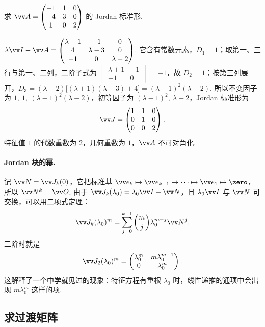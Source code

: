 	\begin{example}\label{eg:jordan3}
		求 $\vv A=\begin{pmatrix}-1&1&0\\-4&3&0\\1&0&2\end{pmatrix}$ 的 Jordan 标准形.
	\end{example}
	\begin{solution}
		$\lambda\vv I-\vv A=\begin{pmatrix}\lambda+1&-1&0\\4&\lambda-3&0\\-1&0&\lambda-2\end{pmatrix}$. 它含有常数元素，$D_1=1$；取第一、三行与第一、二列，二阶子式为 $\begin{vmatrix}\lambda+1&-1\\-1&0\end{vmatrix}=-1$，故 $D_2=1$；按第三列展开，$D_3=(\lambda-2)\big[(\lambda+1)(\lambda-3)+4\big]=(\lambda-1)^2(\lambda-2)$. 所以不变因子为 $1,\ 1,\ (\lambda-1)^2(\lambda-2)$，初等因子为 $(\lambda-1)^2,\ \lambda-2$，Jordan 标准形为
		\[\vv J=\begin{pmatrix}1&1&0\\0&1&0\\0&0&2\end{pmatrix}.\]
		特征值 $1$ 的代数重数为 $2$，几何重数为 $1$，$\vv A$ 不可对角化.
	\end{solution}
	
	\paragraph*{Jordan 块的幂.} 记 $\vv N=\vv J_k(0)$，它把标准基 $\vv e_k\mapsto\vv e_{k-1}\mapsto\cdots\mapsto\vv e_1\mapsto\zero$，所以 $\vv N^k=\vv O$. 由于 $\vv J_k(\lambda_0)=\lambda_0\vv I+\vv N$，且 $\lambda_0\vv I$ 与 $\vv N$ 可交换，可以用二项式定理：
	\[\vv J_k(\lambda_0)^m=\sum_{j=0}^{k-1}\binom mj\lambda_0^{m-j}\vv N^j.\]
	二阶时就是
	\[\vv J_2(\lambda_0)^m=\begin{pmatrix}\lambda_0^m&m\lambda_0^{m-1}\\0&\lambda_0^m\end{pmatrix}.\]
	这解释了一个中学就见过的现象：特征方程有重根 $\lambda_0$ 时，线性递推的通项中会出现 $m\lambda_0^m$ 这样的项.
	
	\subsection{\hC 求过渡矩阵}
	
